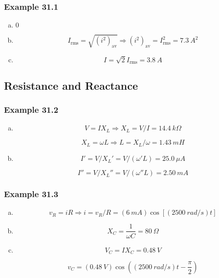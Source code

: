 \documentclass{article}
\begin{document}
\subsubsection{Example 31.1}

\begin{enumerate}[(a)]
  \item $0$

  \item \[I_\text{rms} = \sqrt{(i^2)_\text{av}} \Rightarrow (i^2)_\text{av} = I_\text{rms}^2 = \qty{7.3}{A^2}\]

  \item \[I = \sqrt{2} I_\text{rms} = \qty{3.8}{A}\]
\end{enumerate}

\subsection{Resistance and Reactance}

\subsubsection{Example 31.2}

\begin{enumerate}[(a)]
  \item

        \[V = I X_L \Rightarrow X_L = V / I = \qty{14.4}{k \Omega}\]

        \[X_L = \omega L \Rightarrow L = X_L / \omega = \qty{1.43}{mH}\]

  \item

        \[I' = V / X_L' = V / (\omega' L) = \qty{25.0}{\mu A}\]

        \[I'' = V / X_L'' = V / (\omega'' L) = \qty{2.50}{mA}\]
\end{enumerate}

\subsubsection{Example 31.3}

\begin{enumerate}[(a)]
  \item \[v_R = i R \Rightarrow i = v_R / R = (\qty{6}{mA}) \cos [(\qty{2500}{rad/s}) t]\]

  \item \[X_C = \frac{1}{\omega C} = \qty{80}{\Omega}\]

  \item

        \[V_C = I X_C = \qty{0.48}{V}\]

        \[v_C = (\qty{0.48}{V}) \cos \left( (\qty{2500}{rad/s}) t - \frac{\pi}{2} \right)\]
\end{enumerate}
\end{document}
